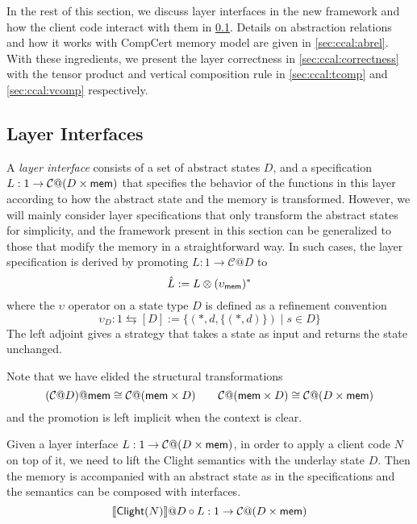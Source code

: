 \documentclass[acmsmall,review,anonymous]{acmart}\settopmatter{printfolios=true,printccs=false,printacmref=false}
\begin{document}
In the rest of this section,
we discuss layer interfaces
in the new framework
and how the client code
interact with them in \ref{sec:ccal:interface}.
Details on abstraction relations
and how it works with CompCert memory model
are given in \ref{sec:ccal:abrel}.
With these ingredients,
we present the layer correctness in \ref{sec:ccal:correctness}
with the tensor product and vertical composition rule
in \ref{sec:ccal:tcomp} and \ref{sec:ccal:vcomp} respectively.


\subsection{Layer Interfaces} %
\label{sec:ccal:interface}



A \emph{layer interface}
consists of a set of abstract states $D$,
and a specification
$L: 1 \rightarrow \mathcal{C}@(D \times  \mathsf{mem} )$
that specifies the behavior of
the functions in this layer
according to how the abstract state and the memory
is transformed.
However,
we will mainly consider layer specifications
that only transform the abstract states
for simplicity,
and the framework present in this section can be generalized to
those that modify the memory in a straightforward way.
In such cases,
the layer specification
is derived by promoting
$L: 1\rightarrow \mathcal{C}@D$
to
\[
  \hat{L} := L \otimes (\upsilon_{ \mathsf{mem} })^*
\]
where the $\upsilon$ operator
on a state type $D$
is defined as a refinement convention
\[
  \upsilon_D : 1 \leftrightarrows [D] := \{ (*, d, \{(*, d)\}) \mid s \in D \}
\]
The left adjoint
gives a strategy that takes a state as input
and returns the state unchanged.

Note that we have elided the structural transformations
\[
  (\mathcal{C}@D)@ \mathsf{mem} 
  \cong
  \mathcal{C}@( \mathsf{mem}  \times D)
    \qquad
  \mathcal{C}@( \mathsf{mem}  \times D)
  \cong
  \mathcal{C}@(D \times  \mathsf{mem} )
\]
and the promotion is left implicit
when the context is clear.


Given a layer interface
$L: 1 \rightarrow \mathcal{C}@(D\times  \mathsf{mem} )$,
in order to apply a client code $N$ on top of it,
we need to lift the Clight semantics
with the underlay state $D$.
Then the memory is accompanied
with an abstract state as in the specifications
and the semantics can be composed with interfaces.
\[
  \llbracket  \mathsf{Clight} (N) \rrbracket @ D \circ L :
  1 \rightarrow \mathcal{C}@(D \times  \mathsf{mem}  )
\]
\end{document}

